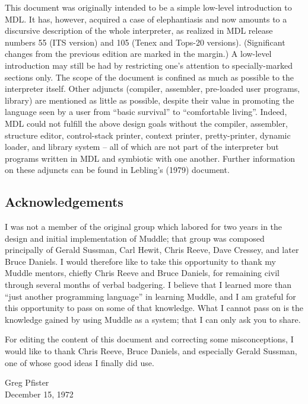 \documentclass[a4paper,]{article}
\begin{document}
This document was originally intended to be a simple low-level introduction to MDL. It has, however, acquired a case of
elephantiasis and now amounts to a discursive description of the whole interpreter, as realized in MDL release numbers 55
(ITS version) and 105 (Tenex and Tops-20 versions). (Significant changes from the previous edition are marked in the
margin.) A low-level introduction may still be had by restricting one's attention to specially-marked sections only. The
scope of the document is confined as much as possible to the interpreter itself. Other adjuncts (compiler, assembler,
pre-loaded user programs, library) are mentioned as little as possible, despite their value in promoting the language seen
by a user from ``basic survival'' to ``comfortable living''. Indeed, MDL could not fulfill the above design goals without
the compiler, assembler, structure editor, control-stack printer, context printer, pretty-printer, dynamic loader, and
library system -- all of which are not part of the interpreter but programs written in MDL and symbiotic with one another.
Further information on these adjuncts can be found in Lebling's (1979) document.

\subsection{Acknowledgements}\label{acknowledgements}

I was not a member of the original group which labored for two years in the design and initial implementation of Muddle;
that group was composed principally of Gerald Sussman, Carl Hewit, Chris Reeve, Dave Cressey, and later Bruce Daniels. I
would therefore like to take this opportunity to thank my Muddle mentors, chiefly Chris Reeve and Bruce Daniels, for
remaining civil through several months of verbal badgering. I believe that I learned more than ``just another programming
language'' in learning Muddle, and I am grateful for this opportunity to pass on some of that knowledge. What I cannot pass
on is the knowledge gained by using Muddle as a system; that I can only ask you to share.

For editing the content of this document and correcting some misconceptions, I would like to thank Chris Reeve, Bruce
Daniels, and especially Gerald Sussman, one of whose good ideas I finally did use.

Greg Pfister\\
December 15, 1972
\end{document}

